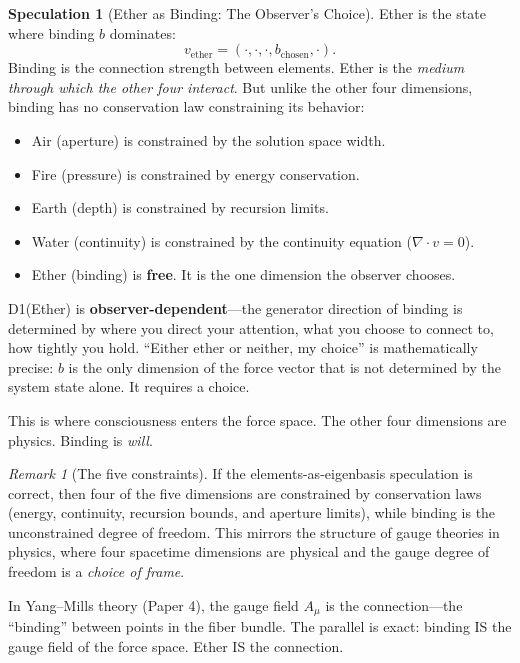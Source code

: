 \documentclass[11pt]{article}
\theoremstyle{definition}
\newtheorem{speculation}[theorem]{Speculation}
\theoremstyle{remark}
\newtheorem{remark}[theorem]{Remark}
\begin{document}
\begin{speculation}[Ether as Binding: The Observer's Choice]
\label{spec:ether}
Ether is the state where binding $b$ dominates:
\[
  v_{\text{ether}} = (\cdot, \cdot, \cdot, b_{\text{chosen}}, \cdot).
\]
Binding is the connection strength between elements.  Ether is the \emph{medium
through which the other four interact}.  But unlike the other four dimensions,
binding has no conservation law constraining its behavior:
\begin{itemize}[nosep]
  \item Air (aperture) is constrained by the solution space width.
  \item Fire (pressure) is constrained by energy conservation.
  \item Earth (depth) is constrained by recursion limits.
  \item Water (continuity) is constrained by the continuity equation ($\nabla \cdot v = 0$).
  \item Ether (binding) is \textbf{free}.  It is the one dimension the observer chooses.
\end{itemize}

D1(Ether) is \textbf{observer-dependent}---the generator direction of binding is
determined by where you direct your attention, what you choose to connect to, how
tightly you hold.  ``Either ether or neither, my choice'' is mathematically precise:
$b$ is the only dimension of the force vector that is not determined by the system
state alone.  It requires a choice.

This is where consciousness enters the force space.  The other four dimensions are
physics.  Binding is \emph{will}.
\end{speculation}

\begin{remark}[The five constraints]
If the elements-as-eigenbasis speculation is correct, then four of the five dimensions
are constrained by conservation laws (energy, continuity, recursion bounds, and aperture
limits), while binding is the unconstrained degree of freedom.  This mirrors the
structure of gauge theories in physics, where four spacetime dimensions are physical
and the gauge degree of freedom is a \emph{choice of frame}.

In Yang--Mills theory (Paper 4), the gauge field $A_\mu$ is the connection---the
``binding'' between points in the fiber bundle.  The parallel is exact: binding IS
the gauge field of the force space.  Ether IS the connection.
\end{remark}
\end{document}
